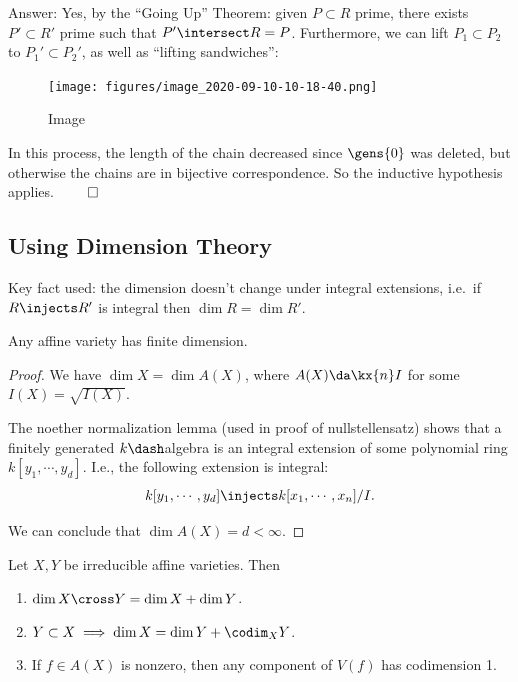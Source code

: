 Answer: Yes, by the ``Going Up'' Theorem: given \(P\subset R\) prime,
there exists \(P'\subset R'\) prime such that \(P'\intersect R = P\).
Furthermore, we can lift \(P_1 \subset P_2\) to \(P_1' \subset P_2'\),
as well as ``lifting sandwiches'':

\begin{figure}
\centering
\texttt{[image: figures/image\_2020-09-10-10-18-40.png]}
\caption{Image}
\end{figure}

In this process, the length of the chain decreased since \(\gens{0}\)
was deleted, but otherwise the chains are in bijective correspondence.
So the inductive hypothesis applies. \(\qed\)

\hypertarget{using-dimension-theory}{%
\subsection{Using Dimension Theory}\label{using-dimension-theory}}

Key fact used: the dimension doesn't change under integral extensions,
i.e.~if \(R\injects R'\) is integral then \(\dim R = \dim R'\).

\begin{claim}

Any affine variety has finite dimension.

\end{claim}

\begin{proof}

We have \(\dim X = \dim A(X)\), where \(A(X) \da \kx{n} I\) for some
\(I(X)=\sqrt{I(X)}\).

The noether normalization lemma (used in proof of nullstellensatz) shows
that a finitely generated \(k\dash\)algebra is an integral extension of
some polynomial ring \(k[y_1, \cdots, y_d]\). I.e., the following
extension is integral:
\begin{align*}  
k[y_1, \cdots, y_d] \injects k[x_1, \cdots, x_n]/I
.\end{align*}

We can conclude that \(\dim A(X) = d < \infty\).

\end{proof}

\begin{proposition}[?]

Let \(X, Y\) be irreducible affine varieties. Then

\begin{enumerate}
\def\labelenumi{\alph{enumi}.}
\tightlist
\item
  \(\dim X\cross Y = \dim X + \dim Y\).
\item
  \(Y\subset X \implies \dim X = \dim Y + \codim_X Y\).
\item
  If \(f\in A(X)\) is nonzero, then any component of \(V(f)\) has
  codimension 1.
\end{enumerate}

\end{proposition}

